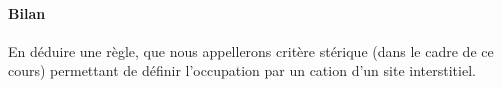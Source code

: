 \paragraph*{Bilan}
\Q En déduire une règle, que nous appellerons \og critère stérique \fg{} (dans le cadre de ce cours) permettant de définir l'occupation par un cation d'un site interstitiel.

 
